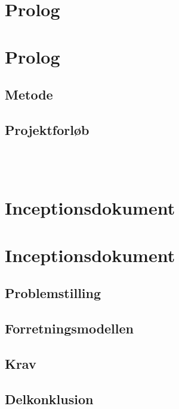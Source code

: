 \documentclass[]{report}
\newcommand*\parttitle{}
\let\origpart\part
\renewcommand*{\part}[2][]{%
    \ifx\\#1\\%
    \origpart{#2}%
    \renewcommand*\parttitle{#2}%
    \else
    \origpart[#1]{#2}%
    \renewcommand*\parttitle{#1}%
    \fi
    }
\begin{document}

	
	
    
    
    
    
    
    
    \part{Prolog} \thispagestyle{fancy}
    
    \chapter{Metode}
    
    
    
    
    
    \chapter{Projektforløb}
    
    
    
    
    \part{Inceptionsdokument} \thispagestyle{fancy}
    
    
    \chapter{Problemstilling}
    
    \chapter{Forretningsmodellen}
    
    \chapter{Krav}
    
    \chapter{Delkonklusion}
    
    
\end{document}
